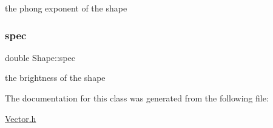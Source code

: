 the phong exponent of the shape \mbox{\label{classShape_a60ef96ac5dea3478fdd1ab320e4c3bef}} 
\subsubsection{\texorpdfstring{spec}{spec}}
{\footnotesize\ttfamily double Shape\+::spec}

the brightness of the shape 

The documentation for this class was generated from the following file\+:\begin{DoxyCompactItemize}
\item 
\hyperlink{Vector_8h}{Vector.\+h}\end{DoxyCompactItemize}
